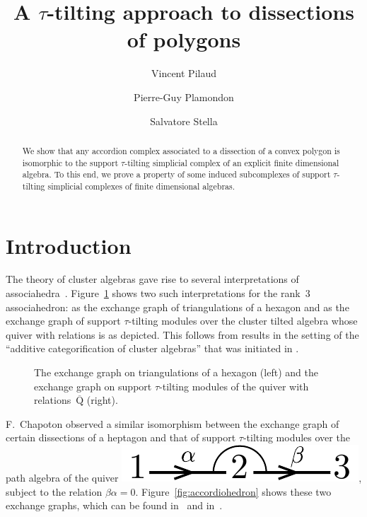 \documentclass{compositio}
\title{A $\tau$-tilting approach to dissections of polygons}
\author{Vincent Pilaud}
\author{Pierre-Guy Plamondon}
\author{Salvatore Stella}
\theoremstyle{definition}
\newcommand{\fref}[1]{Figure~\ref{#1}} %
\newcommand{\quiver}{\mathrm{Q}} %
\begin{document}
\begin{abstract}
We show that any accordion complex associated to a dissection of a convex polygon is isomorphic to the support $\tau$-tilting simplicial complex of an explicit finite dimensional algebra.
To this end, we prove a property of some induced subcomplexes of support $\tau$-tilting simplicial complexes of finite dimensional algebras.
\end{abstract}

\vspace*{-1cm}
\maketitle{}
\vspace*{-.5cm}


\section{Introduction}

The theory of cluster algebras gave rise to several interpretations of associahedra~\cite{Tamari, Stasheff}.
\fref{fig:associahedron} shows two such interpretations for the rank~$3$ associahedron: as the exchange graph of triangulations of a hexagon and as the exchange graph of support $\tau$-tilting modules over the cluster tilted algebra whose quiver with relations is as depicted. 
This follows from results in the setting of the ``additive categorification of cluster algebras'' that was initiated in \cite{CalderoChapotonSchiffler, BuanMarshReinekeReitenTodorov}.

\begin{figure}
	\capstart
	\centerline{\associahedronAccordionTikz{}\associahedronSiltingTikz{}}
	\caption{The exchange graph on triangulations of a hexagon (left) and the exchange graph on support $\tau$-tilting modules of the quiver with relations~$\overline{\quiver}$ (right).}
	\label{fig:associahedron}
\end{figure}

F.~Chapoton observed a similar isomorphism between the exchange graph of certain dissections of a heptagon and that of support $\tau$-tilting modules over the path algebra of the quiver \includegraphics[scale=.35]{relation}, subject to the relation $\beta\alpha = 0$. \fref{fig:accordiohedron} shows these two exchange graphs, which can be found in~\cite[Fig.~7]{Chapoton-quadrangulations} and in~\cite[Exm.~6.4]{AdachiIyamaReiten}.
\end{document}
